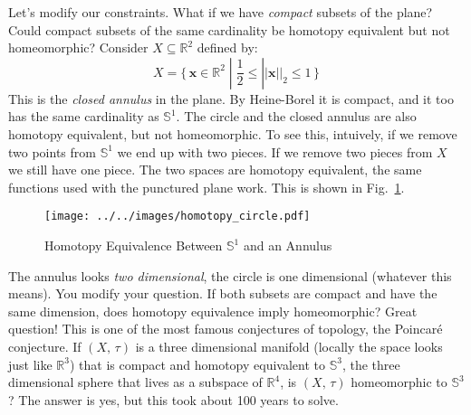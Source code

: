 \documentclass{article}
\theoremstyle{plain}
\theoremstyle{normal}
\begin{document}
        \par\hfill\par
        Let's modify our constraints. What if we have \textit{compact} subsets
        of the plane? Could compact subsets of the same cardinality be
        homotopy equivalent but not homeomorphic? Consider
        $X\subseteq\mathbb{R}^{2}$ defined by:
        \begin{equation}
            X=
            \big\{\,\mathbf{x}\in\mathbb{R}^{2}\;|\;
                \frac{1}{2}\leq||\mathbf{x}||_{2}\leq{1}\,\}
        \end{equation}
        This is the \textit{closed annulus} in the plane. By Heine-Borel it
        is compact, and it too has the same cardinality as $\mathbb{S}^{1}$.
        The circle and the closed annulus are also homotopy equivalent, but
        not homeomorphic. To see this, intuively, if we remove two points from
        $\mathbb{S}^{1}$ we end up with two pieces. If we remove two pieces
        from $X$ we still have one piece. The two spaces are homotopy
        equivalent, the same functions used with the punctured plane work.
        This is shown in Fig.~\ref{fig:homotopy_circle}.
        \begin{figure}[H]
            \centering
            \texttt{[image: ../../images/homotopy\_circle.pdf]}
            \caption{Homotopy Equivalence Between $\mathbb{S}^{1}$ and an Annulus}
            \label{fig:homotopy_circle}
        \end{figure}
        \par\hfill\par
        The annulus looks \textit{two dimensional}, the circle is one
        dimensional (whatever this means). You modify your question.
        If both subsets are compact and have the same dimension, does homotopy
        equivalence imply homeomorphic? Great question! This is one of the
        most famous conjectures of topology, the Poincar\'{e} conjecture.
        If $(X,\,\tau)$ is a three dimensional manifold (locally the space
        looks just like $\mathbb{R}^{3}$) that is compact and homotopy
        equivalent to $\mathbb{S}^{3}$, the three dimensional sphere that lives
        as a subspace of $\mathbb{R}^{4}$, is $(X,\,\tau)$ homeomorphic to
        $\mathbb{S}^{3}$? The answer is yes, but this took about 100 years to
        solve.
\end{document}
